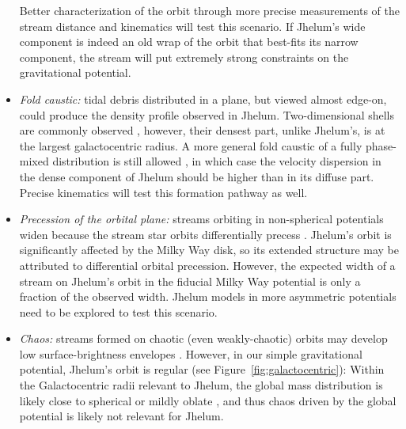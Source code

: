 \documentclass[twocolumn]{aastex62}
\newcommand{\apw}[1]{{\color{blue} APW: #1}}
\begin{document}
\begin{itemize}
{ Better characterization of the orbit through more precise measurements of the stream distance and kinematics will test this scenario.
 If Jhelum's wide component is indeed an old wrap of the orbit that best-fits its narrow component, the stream will put extremely strong constraints on the gravitational potential.
 }
 \item{\emph{Fold caustic:} tidal debris distributed in a plane, but viewed almost edge-on, could produce the density profile observed in Jhelum.
 Two-dimensional shells are commonly observed \citep[e.g.,][]{tal2009,kadofong2018}, however, their densest part, unlike Jhelum's, is at the largest galactocentric radius.
 A more general fold caustic of a fully phase-mixed distribution is still allowed \citep[e.g.,][]{tremaine1999}, in which case the velocity dispersion in the dense component of Jhelum should be higher than in its diffuse part.
 Precise kinematics will test this formation pathway as well.
 }
 \item{\emph{Precession of the orbital plane:} streams orbiting in non-spherical potentials widen because the stream star orbits differentially precess \citep[e.g.,][]{erkal2016, dehnen2018}.
 Jhelum's orbit is significantly affected by the Milky Way disk, so its extended structure may be attributed to differential orbital precession.
 However, the expected width of a stream on Jhelum's orbit in the fiducial Milky Way potential is only a fraction of the observed width.
 Jhelum models in more asymmetric potentials need to be explored to test this scenario.
 }
 \item{\emph{Chaos:} streams formed on chaotic (even weakly-chaotic) orbits may develop low surface-brightness envelopes \citep[e.g.,][]{pw2016}.
 However, in our simple gravitational potential, Jhelum's orbit is regular (see Figure~\ref{fig:galactocentric}):
 Within the Galactocentric radii relevant to Jhelum, the global mass distribution is likely close to spherical or mildly oblate \citep[e.g.,][]{kupper2015}, and thus chaos driven by the global potential is likely not relevant for Jhelum.
}
\end{itemize}
\end{document}
